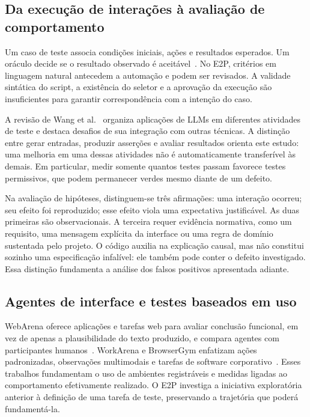 \documentclass[12pt]{article}
\begin{document}
\subsection{Da execução de interações à avaliação de comportamento}
Um caso de teste associa condições iniciais, ações e resultados esperados. Um oráculo decide se o resultado observado é aceitável~\cite{barr2015oracle}. No E2P, critérios em linguagem natural antecedem a automação e podem ser revisados. A validade sintática do script, a existência do seletor e a aprovação da execução são insuficientes para garantir correspondência com a intenção do caso.

A revisão de Wang et al.~\cite{wang2024survey} organiza aplicações de LLMs em diferentes atividades de teste e destaca desafios de sua integração com outras técnicas. A distinção entre gerar entradas, produzir asserções e avaliar resultados orienta este estudo: uma melhoria em uma dessas atividades não é automaticamente transferível às demais. Em particular, medir somente quantos testes passam favorece testes permissivos, que podem permanecer verdes mesmo diante de um defeito.

Na avaliação de hipóteses, distinguem-se três afirmações: uma interação ocorreu; seu efeito foi reproduzido; esse efeito viola uma expectativa justificável. As duas primeiras são observacionais. A terceira requer evidência normativa, como um requisito, uma mensagem explícita da interface ou uma regra de domínio sustentada pelo projeto. O código auxilia na explicação causal, mas não constitui sozinho uma especificação infalível: ele também pode conter o defeito investigado. Essa distinção fundamenta a análise dos falsos positivos apresentada adiante.

\subsection{Agentes de interface e testes baseados em uso}
WebArena oferece aplicações e tarefas web para avaliar conclusão funcional, em vez de apenas a plausibilidade do texto produzido, e compara agentes com participantes humanos~\cite{zhou2024webarena}. WorkArena e BrowserGym enfatizam ações padronizadas, observações multimodais e tarefas de software corporativo~\cite{drouin2024workarena}. Esses trabalhos fundamentam o uso de ambientes registráveis e medidas ligadas ao comportamento efetivamente realizado. O E2P investiga a iniciativa exploratória anterior à definição de uma tarefa de teste, preservando a trajetória que poderá fundamentá-la.
\end{document}
